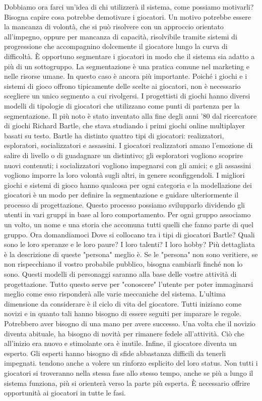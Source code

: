 \begin{itemize}
Dobbiamo ora farci un'idea di chi utilizzerà il sistema, come possiamo motivarli?
Bisogna capire cosa potrebbe demotivare i giocatori. Un motivo potrebbe essere la mancanza di volontà, che si può risolvere con un approccio orientato all'impegno, oppure per mancanza di capacità, risolvibile tramite sistemi di progressione che accompagnino dolcemente il giocatore lungo la curva di difficoltà. È opportuno segmentare i giocatori in modo che il sistema sia adatto a più di un sottogruppo. La segmentazione è una pratica comune nel marketing e nelle risorse umane. In questo caso è ancora più importante. Poiché i giochi e i sistemi di gioco offrono tipicamente delle scelte ai giocatori, non è necessario scegliere un unico segmento a cui rivolgersi.
I progettisti di giochi hanno diversi modelli di tipologie di giocatori che utilizzano come punti di partenza per la segmentazione.
Il più noto è stato inventato alla fine degli anni '80 dal ricercatore di giochi Richard Bartle, che stava studiando i primi giochi online multiplayer basati su testo.
Bartle ha distinto quattro tipi di giocatori: realizzatori, esploratori, socializzatori e assassini. I giocatori realizzatori amano l'emozione di salire di livello o di guadagnare un distintivo; gli esploratori vogliono scoprire nuovi contenuti; i socializzatori vogliono impegnarsi con gli amici; e gli assassini vogliono imporre la loro volontà sugli altri, in genere sconfiggendoli.
I migliori giochi e sistemi di gioco hanno qualcosa per ogni categoria e la modellazione dei giocatori è un modo per definire la segmentazione e guidare ulteriormente il processo di progettazione.
Questo processo possiamo svilupparlo dividendo gli utenti in vari gruppi in base al loro comportamento. Per ogni gruppo associamo un volto, un nome e una storia che accomuna tutti quelli che fanno parte di quel gruppo.
Ora domandiamoci Dove si collocano tra i tipi di giocatori Bartle? Quali sono le loro speranze e le loro paure? I loro talenti? I loro hobby? Più dettagliata è la descrizione di queste "persona" meglio è. Se le "persona" non sono veritiere, se non rispecchiano il vostro probabile pubblico, bisogna cambiarli finché non lo sono. Questi modelli di personaggi saranno alla base delle vostre attività di progettazione. Tutto questo serve per "conoscere" l'utente per poter immaginarsi meglio come esso risponderà alle varie meccaniche del sistema. L'ultima dimensione da considerare è il ciclo di vita del giocatore. Tutti iniziano come novizi e in quanto tali hanno bisogno di essere seguiti per imparare le regole. Potrebbero aver bisogno di una mano per avere successo. Una volta che il novizio diventa abituale, ha bisogno di novità per rimanere fedele all'attività. Ciò che all'inizio era nuovo e stimolante ora è inutile. Infine, il giocatore diventa un esperto. Gli esperti hanno bisogno di sfide abbastanza difficili da tenerli impegnati. tendono anche a volere un rinforzo esplicito del loro
status. Non tutti i giocatori si troveranno nella stessa fase allo stesso tempo, anche se più a lungo il sistema funziona, più si orienterà verso la parte più esperta. È necessario offrire opportunità ai giocatori in tutte le fasi.


\end{itemize}
